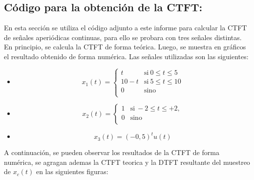 \documentclass[11pt,a4paper]{article}
\begin{document}
\subsection{Código para la obtención de la CTFT:}
    En esta sección se utiliza el código adjunto a este informe para calcular la CTFT de señales aperiódicas continuas, para ello se probara con tres señales distintas. En principio, se calcula la CTFT de forma teórica. Luego, se muestra en gráficos el resultado obtenido de forma numérica. Las señales utilizadas son las siguientes:
    \begin{itemize}
    \item \begin{equation}
    x_{1}(t) = \left\{ 
        \begin{array}{ll} 
        t & \mathrm{si\ } 0\leq t \leq 5 \\
        10-t & \mathrm{si\ } 5\leq t \leq 10 \\
        0 & \mathrm{sino\ } \\
        \end{array} 
        \right.
    \end{equation}
    
    \item \begin{equation} 
        x_{2}(t) = \left\{ 
        \begin{array}{ll} 
        1 & \mathrm{si\ } -2\leq t \leq +2, \\
        0 & \mathrm{sino\ } \\
        \end{array} 
        \right.
    \end{equation}
    
    \item \begin{equation} 
        x_{3}(t)=(-0,5)^{t}u(t)
    \end{equation}

    \end{itemize}   
    
    A continuación, se pueden observar los resultados de la CTFT de forma numérica, se agragan ademas la CTFT teorica y la DTFT resultante del muestreo de $x_{c}(t)$ en las siguientes figuras:
    
\end{document}
